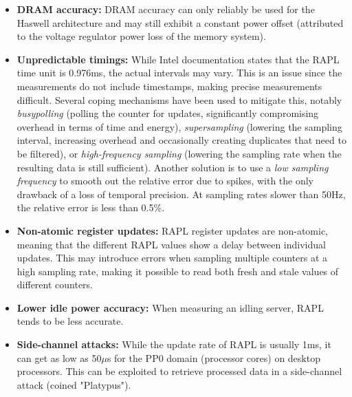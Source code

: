 \begin{itemize}
    \item \textbf{DRAM accuracy:} DRAM accuracy can only reliably be used for the Haswell architecture\parencite{desrochers2016validation, khan2018rapl, alt2024experimental} and may still exhibit a constant power offset (attributed to the voltage regulator power loss of the memory system).
    
    \item \textbf{Unpredictable timings:} While Intel documentation states that the RAPL time unit is 0.976ms, the actual intervals may vary. This is an issue since the measurements do not include timestamps, making precise measurements difficult\parencite{khan2018rapl}. Several coping mechanisms have been used to mitigate this, notably \textit{busypolling} (polling the counter for updates, significantly compromising overhead in terms of time and energy\parencite{hahnel2012measuring}), \textit{supersampling} (lowering the sampling interval, increasing overhead and occasionally creating duplicates that need to be filtered\parencite{khan2018rapl}), or \textit{high-frequency sampling} (lowering the sampling rate when the resulting data is still sufficient\parencite{servat2016detailed}). Another solution is to use a \textit{low sampling frequency} to smooth out the relative error due to spikes, with the only drawback of a loss of temporal precision. At sampling rates slower than 50Hz, the relative error is less than 0.5\%\parencite{jay2023experimental}.
    
    \item \textbf{Non-atomic register updates:} RAPL register updates are non-atomic\parencite{khan2018rapl}, meaning that the different RAPL values show a delay between individual updates. This may introduce errors when sampling multiple counters at a high sampling rate, making it possible to read both fresh and stale values of different counters.
    
    \item \textbf{Lower idle power accuracy:} When measuring an idling server, RAPL tends to be less accurate\parencite{schone2024energy, desrochers2016validation}.
    
    \item \textbf{Side-channel attacks:} While the update rate of RAPL is usually 1ms, it can get as low as 50$\mu$s for the PP0 domain (processor cores) on desktop processors\parencite{schone2024energy}. This can be exploited to retrieve processed data in a side-channel attack (coined "Platypus")\parencite{lipp2021platypus, schone2024energy}.
    

\end{itemize}

